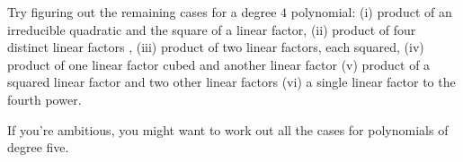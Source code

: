 \documentclass[10pt]{amsart}
\begin{document}
Try figuring out the remaining cases for a degree $4$ polynomial: (i)
product of an irreducible quadratic and the square of a linear factor,
(ii) product of four distinct linear factors , (iii) product of two
linear factors, each squared, (iv) product of one linear factor cubed
and another linear factor (v) product of a squared linear factor and
two other linear factors (vi) a single linear factor to the fourth
power.

If you're ambitious, you might want to work out all the cases for
polynomials of degree five.
\end{document}
